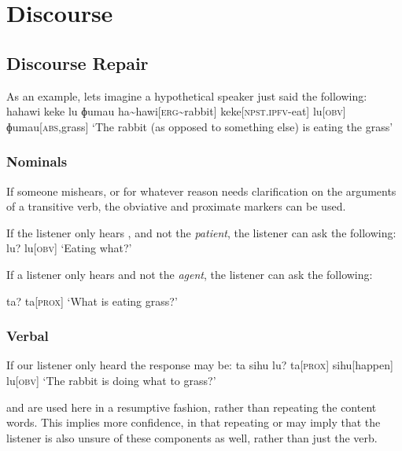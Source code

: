 
\chapter{Discourse}

\section{Discourse Repair}
As an example, lets imagine a hypothetical speaker just said the following:
\ex
\begingl
\glpreamble hahawi keke lu ɸumau
\endpreamble
ha\textasciitilde hawi[\textsc{erg\textasciitilde}rabbit]
keke[\textsc{npst.ipfv-}eat]
lu[\textsc{obv}]
ɸumau[\textsc{abs,}grass]
\glft `The rabbit (as opposed to something else) is eating the grass'
\endgl
\xe

\subsection{Nominals}

If someone mishears, or for whatever reason needs clarification on the arguments of a transitive verb, the obviative and proximate markers can be used.

\begin{paracol}{2}
If the listener only hears , and not the \textit{patient}, the listener can ask the following:
\ex
\begingl
\glpreamble lu?
\endpreamble
lu[\textsc{obv}]
\glft `Eating what?'
\endgl
\xe
\switchcolumn

If a listener only hears  and not the \textit{agent}, the listener can ask the following:

\ex
\begingl
\glpreamble ta?
\endpreamble
ta[\textsc{prox}]
\glft `What is eating grass?'
\endgl
\xe
\end{paracol}

\subsection{Verbal}
If our listener only heard  the response may be:
\ex
\begingl
\glpreamble ta sihu lu?
\endpreamble
ta[\textsc{prox}]
sihu[happen]
lu[\textsc{obv}]
\glft `The rabbit is doing what to grass?'
\endgl
\xe

 and  are used here in a resumptive fashion, rather than repeating the content words. This implies more confidence, in that repeating  or  may imply that the listener is also unsure of these components as well, rather than just the verb.

